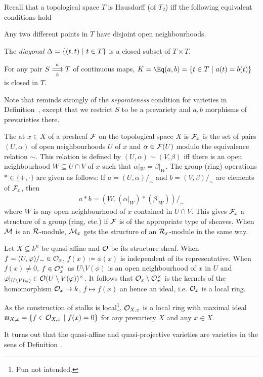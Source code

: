 \documentclass[a4paper,parskip=half,numbers=enddot, DIV=12]{scrreprt}
\begin{document}
\begin{rem}
    Recall that a topological space $T$ is  Hausdorff (of $T_2$) iff the following equivalent conditions hold
    \begin{alphanumerate}
        \item 
            Any two different points in $T$ have disjoint open neighbourhoods.
        \item 
            The \emph{diagonal} $\Delta = \left\{ (t,t)\ \middle|\  t\in T\right\}$ is a closed subset of $T\times T$.
        \item 
            For any pair $S\doublemorphism[a][\smash{b}] T$ of continuous maps, $K = \Eq(a,b) =\left\{t\in T\st a(t) = b(t)\right\}$ is closed in $T$.
    \end{alphanumerate}
    Note that  reminds strongly of the \emph{separateness} condition for varieties in Definition~, except that we restrict $S$ to be a prevariety and $a,b$ morphisms of prevarieties there.
\end{rem}
\begin{defi}[Stalk]
    The  at $x\in X$ of a presheaf $\mathcal{F}$ on the topological space $X$ is $\mathcal{F}_x$ is the set of pairs $(U,\alpha)$ of open neighbourhoods $U$ of $x$ and $\alpha\in \mathcal{F}(U)$ modulo the equivalence relation $\sim$. This relation is defined by $(U,\alpha)\sim (V, \beta)$ iff there is an open neighbourhood $W\subseteq U\cap V$ of $x$ such that $\alpha|_W = \beta|_W$. The group (ring) operations $*\in \{+,\cdot\}$ are given as follows: If $a= (U,\alpha)/_\sim$ and $b= (V,\beta)/_\sim$ are elements of $\mathcal{F}_x$, then 
    \begin{align*}
        a* b = (W, (\alpha|_W)*(\beta|_W))/_\sim
    \end{align*}
    where $W$ is any open neighbourhood of $x$ contained in $U\cap V$. This gives $\mathcal{F}_x$ a structure of a group (ring, etc.) if $\mathcal{F}$ is of the appropriate type of sheaves. When $\mathcal{M}$ is an $\mathcal{R}$-module, $\mathcal{M}_x$ gets the structure of an $\mathcal{R}_x$-module in the same way.
\end{defi}
\begin{rem}
    Let $X\subseteq k^n$ be quasi-affine and $\mathcal{O}$ be its structure sheaf. When $f=(U,\varphi)/_\sim\in \mathcal{O}_x$, $f(x)\coloneqq \phi(x)$ is independent of its representative. When $f(x)\neq 0$, $f\in \mathcal{O}_x^\times$ as $U\setminus V(\phi)$ is an open neighbourhood of $x$ in $U$ and $\varphi|_{U\setminus V(\varphi)} \in \mathcal{O}(U\setminus V(\varphi))^\times$. It follows that $\mathcal{O}_x\setminus\mathcal{O}_x^\times$ is the kernels of the homomorphism $\Oo_x \morphism k$, $f\mapsto f(x)$ an hence an ideal, i.e. $\mathcal{O}_x$ is a local ring. 
    
    As the construction of stalks is local\footnote{Pun not intended.}, $\mathcal{O}_{X,x}$ is a local ring with maximal ideal $\mathfrak{m}_{X,x} = \left\{f\in \mathcal{O}_{X,x}\ \middle|\  f(x) = 0\right\}$ for any prevariety $X$ and any $x\in X$. 
\end{rem}
\begin{rem}
    It turns out that the quasi-affine and quasi-projective varieties are varieties in the sens of Definition .
\end{rem}
\printbibliography
\end{document}
